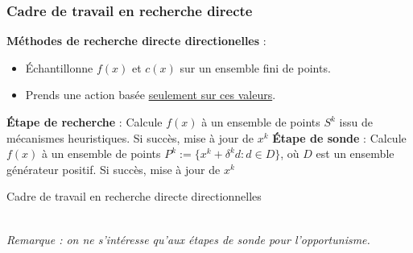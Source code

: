 \documentclass{beamer}
\begin{document}
\begin{frame}%
\frametitle{Cadre de travail en recherche directe}
\textbf{Méthodes de recherche directe directionelles} :
\begin{itemize}
	\pause
	\item Échantillonne $f(x)$ et $c(x)$ sur un ensemble fini de points.
	\pause
	\item Prends une action basée \underline{seulement sur ces valeurs}.
\end{itemize}
\pause
\setcounter{algorithm}{0}
\begin{minipage}{0.7\linewidth}
\begin{algorithm}[H]
	\scriptsize
	\begin{algorithmic}[]
		\STATE \textbf{Étape de recherche} : Calcule $f(x)$ à un ensemble de points $S^k$ issu de mécanismes heuristiques.
		\STATE Si succès, mise à jour de $x^k$
		\STATE
		\STATE \textbf{Étape de sonde} : Calcule $f(x)$ à un ensemble de points 
		\STATE $P^k:=\{x^k+\delta ^k d:d\in D\}$, où $D$ est un ensemble générateur positif. 
		\STATE Si succès, mise à jour de $x^k$
		\ENDFOR
	\end{algorithmic}
	\caption{Cadre de travail en recherche directe directionnelles}
	\label{alg:seq}
\end{algorithm}
\end{minipage}\\	
\textit{Remarque : on ne s'intéresse qu'aux étapes de sonde pour l'opportunisme.}
\end{frame}
\end{document}
